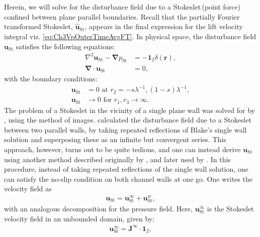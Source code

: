\documentclass{jfm}
\begin{document}
\section{} \label{App:A}
Herein, we will solve for the disturbance field due to a Stokeslet\,(point force) confined between plane parallel boundaries. Recall that the partially Fourier transformed Stokeslet, $\hat{\bm{u}}_\text{St}$, appears in the final expression for the lift velocity integral viz. \eqref{eq:Ch3VpOuterTimeAvgFT}. In physical space, the disturbance field $\bm{u}_\text{St}$ satisfies the following equations:
\begin{subequations}  \label{eq:Ch3StokesletEqn}
	\begin{align}
	\nabla^2 \bm{u}_\text{St}-\bm{\nabla}p_\text{St}&=- \bm{1}_2\delta(\bm{r}),\\
	\bm{\nabla}\cdot\bm{u}_\text{St}&=0,
	\end{align} 
\end{subequations}
	with the boundary conditions: 
\begin{subequations} \label{eq:Ch3StokesletBC}
	\begin{align}
	\bm{u}_\text{St}&=0 \text{ at } r_2=-s\lambda^{-1}, (1-s)\lambda^{-1},\\
	\bm{u}_\text{St}&\rightarrow 0 \text{ for } r_1,r_3\rightarrow\infty.
	\end{align}
\end{subequations}
The problem of a Stokeslet in the vicinity of a single plane wall was solved for by \cite{blake1971}, using the method of images. \cite{liron1976} calculated the disturbance field due to a Stokeslet between two parallel walls, by taking repeated reflections of Blake's single wall solution and superposing these as an infinite but convergent series. This approach, however, turns out to be quite tedious, and one can instead derive $\bm{u}_\text{St}$ using another method described originally by \cite{vasseur1976}, and later used by \cite{brady2010}. In this procedure, instead of taking repeated reflections of the single wall solution, one can satisfy the no-slip condition on both channel walls at one go. One writes the velocity field as
\begin{align}
\bm{u}_\text{St}=\bm{u}^{\infty}_\text{St}+\bm{u}^{w}_\text{St}, 
\label{eq:Ch3Reflections}
\end{align}
with an analogous decomposition for the pressure field. Here, $\bm{u}^{\infty}_\text{St}$ is the Stokeslet velocity field in an unbounded domain, given by:
\begin{align}
\bm{u}^{\infty}_\text{St}=\bm{J}^\infty\cdot\bm{1}_2,
\label{eq:Ch3StokesletUnboundeddomain}
\end{align}
\end{document}
